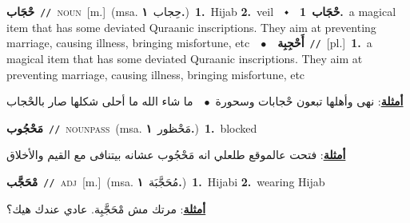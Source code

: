 \documentclass[10pt,a4paper,twoside]{article} %
\begin{document}
\begin{multicols}{2}
{\setlength\topsep{0pt}\textbf{\foreignlanguage{arabic}{حْجَاب}}\ {\color{gray}\texttt{//}\color{black}}\ \textsc{noun}\ [m.]\ \color{gray}(msa. \foreignlanguage{arabic}{حِجاب}~\foreignlanguage{arabic}{\textbf{١.}})\color{black}\ \textbf{1.}~Hijab  \textbf{2.}~veil\ \ $\smblkdiamond$\ \ \setlength\topsep{0pt}\textbf{\foreignlanguage{arabic}{حْجَاب}}\ \textbf{1.}~a magical item that has some deviated Quraanic inscriptions. They aim at preventing marriage, causing illness, bringing misfortune, etc\ \ $\bullet$\ \ \setlength\topsep{0pt}\textbf{\foreignlanguage{arabic}{أَحْجِبِة}}\ {\color{gray}\texttt{//}\color{black}}\ [pl.]\ \textbf{1.}~a magical item that has some deviated Quraanic inscriptions. They aim at preventing marriage, causing illness, bringing misfortune, etc\  \begin{flushright}\color{gray}\foreignlanguage{arabic}{\textbf{\underline{\foreignlanguage{arabic}{أمثلة}}}: نهى وأهلها تبعون حْجابات وسحورة\ $\bullet$\ \  ما شاء الله ما أحلى شكلها صار بالحْجاب}\end{flushright}\color{black}} \vspace{2mm}

{\setlength\topsep{0pt}\textbf{\foreignlanguage{arabic}{مَحْجُوب}}\ {\color{gray}\texttt{//}\color{black}}\ \textsc{noun\textunderscore pass}\ \color{gray}(msa. \foreignlanguage{arabic}{مَحْظور}~\foreignlanguage{arabic}{\textbf{١.}})\color{black}\ \textbf{1.}~blocked\  \begin{flushright}\color{gray}\foreignlanguage{arabic}{\textbf{\underline{\foreignlanguage{arabic}{أمثلة}}}: فتحت عالموقع طلعلي انه مَحْجُوب عشانه بيتنافى مع القيم والأخلاق}\end{flushright}\color{black}} \vspace{2mm}

{\setlength\topsep{0pt}\textbf{\foreignlanguage{arabic}{مْحَجَّب}}\ {\color{gray}\texttt{//}\color{black}}\ \textsc{adj}\ [m.]\ \color{gray}(msa. \foreignlanguage{arabic}{مُحَجَّبَة}~\foreignlanguage{arabic}{\textbf{١.}})\color{black}\ \textbf{1.}~Hijabi  \textbf{2.}~wearing Hijab\  \begin{flushright}\color{gray}\foreignlanguage{arabic}{\textbf{\underline{\foreignlanguage{arabic}{أمثلة}}}: مرتك مش مْحَجَّبِة. عادي عندك هيك؟}\end{flushright}\color{black}} \vspace{2mm}


\end{multicols}
\end{document}
